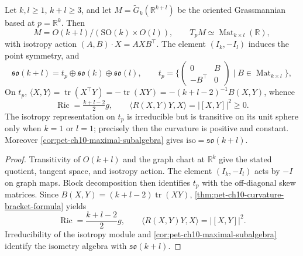 \begin{example}
  \label{ex:pet-ch10-compact-grassmannian}
  Let $k,l\ge1$, $k+l\ge3$, and let
  $M=\widetilde G_k(\mathbb R^{k+l})$ be the oriented Grassmannian based at
  $p=\mathbb R^k$. Then
  \[
    M=O(k+l)/(\mathrm{SO}(k)\times O(l)),\qquad
    T_pM\simeq\operatorname{Mat}_{k\times l}(\mathbb R),
  \]
  with isotropy action $(A,B)\cdot X=AXB^\top$. The element $(I_k,-I_l)$
  induces the point symmetry, and
  \[
    \mathfrak{so}(k+l)=t_p\oplus\mathfrak{so}(k)\oplus\mathfrak{so}(l),
    \qquad
    t_p=\Big\{\begin{pmatrix}0&B\\-B^\top&0\end{pmatrix}\mid B\in\operatorname{Mat}_{k\times l}\Big\},
  \]
  On $t_p$,
  $\langle X,Y\rangle=\operatorname{tr}(X^\top Y)=-\operatorname{tr}(XY)
  =-(k+l-2)^{-1}B(X,Y)$, whence
  \[
    \operatorname{Ric}=\tfrac{k+l-2}2g,\qquad
    \langle R(X,Y)Y,X\rangle=|[X,Y]|^2\ge0.
  \]
  The isotropy representation on $t_p$ is irreducible but is transitive on its
  unit sphere only when $k=1$ or $l=1$; precisely then the curvature is positive
  and constant. Moreover
  \cref{cor:pet-ch10-maximal-subalgebra} gives
  $\mathrm{iso}=\mathfrak{so}(k+l)$.
\end{example}
\begin{proof}
  \sketch
  Transitivity of $O(k+l)$ and the graph chart at $\mathbb R^k$ give the stated
  quotient, tangent space, and isotropy action. The element $(I_k,-I_l)$ acts
  by $-I$ on graph maps. Block decomposition then identifies $t_p$ with the
  off-diagonal skew matrices. Since
  $B(X,Y)=(k+l-2)\operatorname{tr}(XY)$,
  \cref{thm:pet-ch10-curvature-bracket-formula} yields
  \[
    \operatorname{Ric}=\frac{k+l-2}{2}g,\qquad
    \langle R(X,Y)Y,X\rangle=|[X,Y]|^2.
  \]
  Irreducibility of the isotropy module and
  \cref{cor:pet-ch10-maximal-subalgebra} identify the isometry algebra with
  $\mathfrak{so}(k+l)$.
\end{proof}


